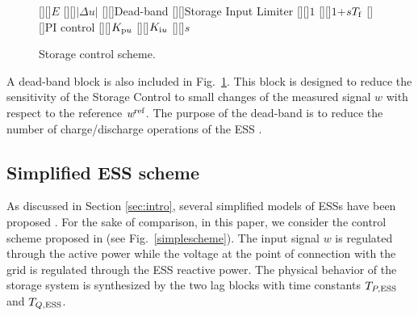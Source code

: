 \documentclass[journal, a4paper]{IEEEtran}
\begin{document}
\begin{figure}[t!]
  \begin{center}
    [][]{\LARGE $E$}
    [][]{\huge $|\Delta u|$}
    [][]{\huge Dead-band}
    [][]{\huge Storage Input Limiter}
    [][]{\huge $1$}
    [][]{\huge$1$+$s T_{\rm f}$}
    \psfrag{+}{}    
    \psfrag{-}{{\large $-$}}
    [][]{\huge PI control}    
    [][]{\huge$K_{{\rm p}u}$}
    [][]{\huge$K_{{\rm i}u}$}
[][]{\huge$s$}
    \caption{Storage control scheme.}
    \label{inputsignalcontrol}
  \end{center}
\vspace{-0.4cm}
\end{figure}
A dead-band block is also included in Fig.~\ref{inputsignalcontrol}. 
This block is designed to reduce the sensitivity of the Storage
Control to small changes of the measured signal $\textit{w}$ with
respect to the reference $\textit{w}^{\rm ref}$.  The purpose of the
dead-band is to reduce the number of charge/discharge operations of
the ESS \cite{milano:13}. 

\subsection{Simplified ESS scheme}
\label{subsec:simpleESS}

As discussed in Section \ref{sec:intro}, several simplified models of
ESSs have been proposed \cite{pal:00, wu:12, sui:14, singh:13,
  fang:14}.  For the sake of comparison, in this paper, we consider
the control scheme proposed in \cite{pal:00} (see
Fig.~\ref{simplescheme}).  The input signal $\textit{w}$ is regulated
through the active power while the voltage at the point of connection
with the grid is regulated through the ESS reactive power.  The
physical behavior of the storage system is synthesized by the two lag
blocks with time constants $T_{P, \rm ESS}$ and $T_{Q, \rm ESS}$.
\end{document}

